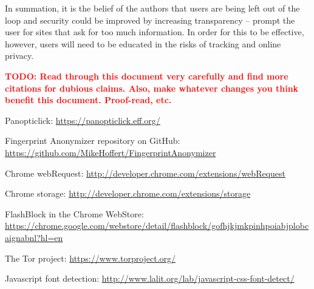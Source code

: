 \documentclass[12pt,a4paper]{article}
\begin{document}
In summation, it is the belief of the authors that users are being left out of the loop and security could be improved by increasing transparency -- prompt the user for sites that ask for too much information. In order for this to be effective, however, users will need to be educated in the risks of tracking and online privacy.

\textcolor{red}{\textbf{TODO: Read through this document very carefully and find more citations for dubious claims. Also, make whatever changes you think benefit this document. Proof-read, etc.}}

\begin{thebibliography}{0}

  Panopticlick: \url{https://panopticlick.eff.org/}

  Fingerprint Anonymizer repository on GitHub: \url{https://github.com/MikeHoffert/FingerprintAnonymizer}

  Chrome webRequest: \url{http://developer.chrome.com/extensions/webRequest}
  
  Chrome storage: \url{http://developer.chrome.com/extensions/storage}
  
  FlashBlock in the Chrome WebStore: \url{https://chrome.google.com/webstore/detail/flashblock/gofhjkjmkpinhpoiabjplobcaignabnl?hl=en}
  
  The Tor project: \url{https://www.torproject.org/}

  Javascript font detection: \url{http://www.lalit.org/lab/javascript-css-font-detect/}

\end{thebibliography}
\end{document}
